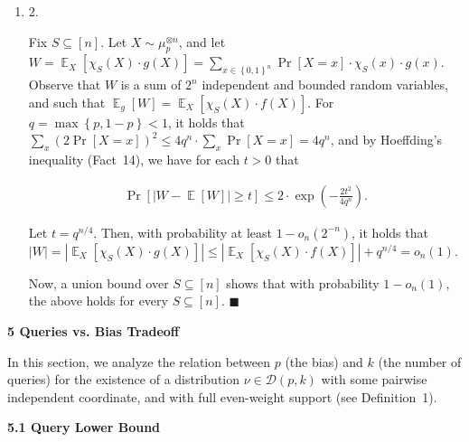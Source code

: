 \begin{enumerate}
\item[] 
2. 


Fix $S\subseteq[n]$. Let $X\sim\mu_{p}^{\otimes n}$, and let $W=\mathop{\mathbb{E}}_{X}\left[\chi_{S}(X)\cdot g(X)\right]=\sum_{x\in\left\{0,1\right\}^{n}}\Pr\left[X=x\right]\cdot\chi_{S}(x)\cdot g(x)$. Observe that $W$ is a sum of $2^{n}$ independent and bounded random variables, and such that $\mathop{\mathbb{E}}_{g}[W]=\mathop{\mathbb{E}}_{X}\left[\chi_{S}(X)\cdot f(X)\right]$. For $q=\max\left\{p,1-p\right\}<1$, it holds that $\sum_{x}(2\Pr[X=x])^{2}\leqslant 4q^{n}\cdot\sum_{x}\Pr[X=x]=4q^{n}$, and by Hoeffding’s inequality (Fact 14), we have for each $t>0$ that\par


\[\begin{gathered}
\Pr\left[\left|W-\mathop{\mathbb{E}}[W]\right|\geqslant t\right]\leqslant 2\cdot\exp\left(-\frac{2t^{2}}{4q^{n}}\right).
\end{gathered}\]


Let $t=q^{n/4}$.
Then, with probability at least $1-o_{n}(2^{-n})$, it holds that $\left|W\right|=\left|\mathop{\mathbb{E}}_{X}\left[\chi_{S}(X)\cdot g(X)\right]\right|\leqslant\left|\mathop{\mathbb{E}}_{X}\left[\chi_{S}(X)\cdot f(X)\right]\right|+q^{n/4}=o_{n}(1).$\par




Now, a union bound over $S\subseteq[n]$ shows that with probability $1-o_{n}(1)$, the above holds for every $S\subseteq[n]$.
\ensuremath{\blacksquare}\par





\end{enumerate}






\par\medskip\noindent\textbf{
5 Queries vs. Bias Tradeoff}\par




In this section, we analyze the relation between $p$ (the bias) and $k$ (the number of queries) for the existence of a distribution $\nu\in\mathcal{D}(p,k)$ with some pairwise independent coordinate, and with full even-weight support (see Definition 1).\par




\par\medskip\noindent\textbf{
5.1 Query Lower Bound}\par




